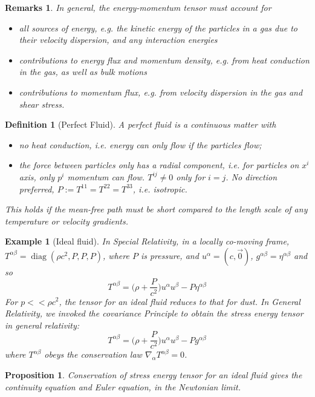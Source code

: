 \documentclass[a4paper]{article}
\DeclareMathOperator{\diag}{diag}
\newtheorem{eg}{Example}[section]
\newtheorem{remarks}{Remarks}[section]
\theoremstyle{new}
\newtheorem{defi}{Definition}[section]
\newtheorem{prop}{Proposition}[section]
\begin{document}
\begin{remarks}
In general, the energy-momentum tensor must account for
\begin{itemize}
    \item all sources of energy, e.g. the kinetic energy of the particles in a gas due to their velocity dispersion, and any interaction energies
    \item contributions to energy flux and momentum density, e.g. from heat conduction in the gas, as well as bulk motions
    \item contributions to momentum flux, e.g. from velocity dispersion in the gas and shear stress.
\end{itemize}
\end{remarks}
\begin{defi}[Perfect Fluid]
A perfect fluid is a continuous matter with
\begin{itemize}
    \item no heat conduction, i.e. energy can only flow if the particles flow;
    \item the force between particles only has a radial component, i.e. for particles on $x^i$ axis, only $p^i$ momentum can flow. $T^{ij}\neq 0$ only for $i=j$. No direction preferred, $P:=T^{11}=T^{22}=T^{33}$, i.e. isotropic.
\end{itemize}
This holds if the mean-free path must be short compared to the length scale of any temperature or velocity gradients.
\end{defi}
\begin{eg}[Ideal fluid]
In Special Relativity, in a locally co-moving frame, $T^{\alpha\beta}=\diag(\rho c^2,P,P,P)$, where $P$ is pressure, and $u^\alpha=(c,\vec{0})$, $g^{\alpha\beta}=\eta^{\alpha\beta}$ and so
$$T^{\alpha\beta}=\bigg(\rho+\frac{P}{c^2}\bigg)u^\alpha u^\beta -P\eta^{\alpha\beta}$$
For $p<<\rho c^2$, the tensor for an ideal fluid reduces to that for dust. In General Relativity, we invoked the covariance Principle to obtain the stress energy tensor in general relativity:
\begin{equation}
T^{\alpha\beta}=\bigg(\rho+\frac{P}{c^2}\bigg)u^\alpha u^\beta -Pg^{\alpha\beta}\label{stressenergytensor}
\end{equation}
where $T^{\alpha\beta}$ obeys the conservation law $\nabla_\alpha T^{\alpha\beta}=0$. 
\end{eg}
\begin{prop}
Conservation of stress energy tensor for an ideal fluid gives the continuity equation and Euler equation, in the Newtonian limit.
\end{prop}
\end{document}
